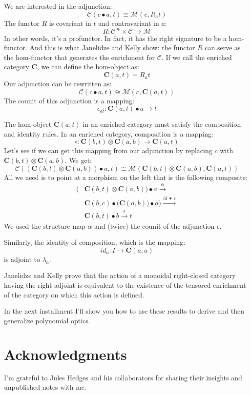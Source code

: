 \documentclass[11pt]{amsart}
\begin{document}
We are interested in the adjunction:
\[ \mathcal{C}( c \bullet a, t) \cong \mathcal{M}(c, R_a t) \]
The functor $R$ is covariant in $t$ and contravariant in $a$:
\[ R \colon \mathcal{C}^{op} \times \mathcal{C} \to \mathcal{M} \]
In other words, it's a profunctor. In fact, it has the right signature to be a hom-functor. And this is what Janelidze and Kelly show: the functor $R$ can serve as the hom-functor that generates the enrichment for $\mathcal{C}$. If we call the enriched category $\mathbf{C}$, we can define the hom-object as:
\[\mathbf{C}(a, t) = R_a t \]
Our adjunction can be rewritten as:
\[ \mathcal{C}( c \bullet a, t) \cong \mathcal{M}(c, \mathbf{C}(a, t)) \]
The counit of this adjunction is a mapping:
\[ \epsilon_{a t} \colon \mathbf{C}(a, t)  \bullet a \to t \]

The hom-object $\mathbf{C}(a, t)$ in an enriched category must satisfy the composition and identity rules. In an enriched category, composition is a mapping:
\[ \circ \colon \mathbf{C}(b, t) \otimes \mathbf{C}(a, b) \to \mathbf{C}(a, t) \]
Let's see if we can get this mapping from our adjunction by replacing $c$ with $\mathbf{C}(b, t) \otimes \mathbf{C}(a, b)$. We get:
\[ \mathcal{C}( (\mathbf{C}(b, t) \otimes \mathbf{C}(a, b)) \bullet a, t) \cong \mathcal{M}(\mathbf{C}(b, t) \otimes \mathbf{C}(a, b), \mathbf{C}(a, t)) \]
All we need is to point at a morphism on the left that is the following composite:
\begin{align*}
\big( & \mathbf{C}(b, t) \otimes \mathbf{C}(a, b)\big) \bullet a  \xrightarrow{\alpha}
\\ &\mathbf{C}(b, c) \bullet \big(\mathbf{C}(a, b)) \bullet a\big)   \xrightarrow{id \; \bullet \; \epsilon}
\\ &\mathbf{C}(b, t) \bullet b  \xrightarrow{\epsilon} t
\end{align*}
We used the structure map $\alpha$ and (twice) the counit of the adjunction $\epsilon$.

Similarly, the identity of composition, which is the mapping:
\[ id_a \colon I \to \mathbf{C}(a, a) \]
is adjoint to $\lambda_a$.

Janelidze and Kelly prove that the action of a monoidal right-closed category having the right adjoint is equivalent to the existence of the tensored enrichment of the category on which this action is defined.

In the next installment I'll show you how to use these results to derive and then generalize polynomial optics.

\section{Acknowledgments}
I'm grateful to Jules Hedges and his collaborators for sharing their insights and unpublished notes with me.
\end{document}
